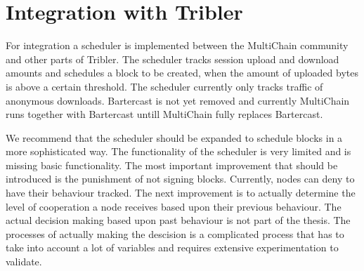 \section{Integration with Tribler}
For integration a scheduler is implemented between the MultiChain community
and other parts of Tribler.
The scheduler tracks session upload and download amounts and schedules a block to be created,
when the amount of uploaded bytes is above a certain threshold.
The scheduler currently only tracks traffic of anonymous downloads.
Bartercast is not yet removed and
currently MultiChain runs together with Bartercast untill MultiChain fully replaces Bartercast.

We recommend that the scheduler should be expanded to schedule blocks in a more sophisticated way.
The functionality of the scheduler is very limited and is missing basic functionality.
The most important improvement that should be introduced is the punishment of not signing blocks.
Currently, nodes can deny to have their behaviour tracked.
The next improvement is to actually determine the level of cooperation a node receives based upon their previous behaviour.
The actual decision making based upon past behaviour is not part of the thesis.
The processes of actually making the descision is a complicated process that has to take into account a lot of variables
and requires extensive experimentation to validate.